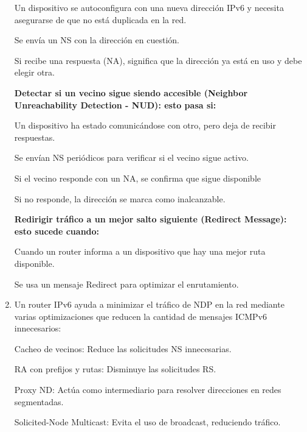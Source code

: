\documentclass[12pt]{article}
\begin{document}
\begin{enumerate}
 	\hspace{2cm}Un dispositivo se autoconfigura con una nueva dirección IPv6 y necesita asegurarse de que no está duplicada en la red.
 	
 	\hspace{2cm}Se envía un NS con la dirección en cuestión.
 	
 	\hspace{2cm}Si recibe una respuesta (NA), significa que la dirección ya está en uso y debe elegir otra.
 	
 	\textbf{Detectar si un vecino sigue siendo accesible (Neighbor Unreachability Detection - NUD): esto pasa si:}
 	
 	\hspace{2cm}Un dispositivo ha estado comunicándose con otro, pero deja de recibir respuestas.
 	
 	\hspace{2cm}Se envían NS periódicos para verificar si el vecino sigue activo.
 	
 	\hspace{2cm}Si el vecino responde con un NA, se confirma que sigue disponible
 	
 	\hspace{2cm}Si no responde, la dirección se marca como inalcanzable.
 	
 	\textbf{Redirigir tráfico a un mejor salto siguiente (Redirect Message): esto sucede cuando:}
 	
 	\hspace{2cm}Cuando un router informa a un dispositivo que hay una mejor ruta disponible.
 	
 	\hspace{2cm}Se usa un mensaje Redirect para optimizar el enrutamiento.
 	
 	\item Un router IPv6 ayuda a minimizar el tráfico de NDP en la red mediante varias optimizaciones que reducen la cantidad de mensajes ICMPv6 innecesarios:
 	
 	\hspace{2cm}Cacheo de vecinos: Reduce las solicitudes NS innecesarias.
 	
 	\hspace{2cm}RA con prefijos y rutas: Disminuye las solicitudes RS.
 	
 	\hspace{2cm}Proxy ND: Actúa como intermediario para resolver direcciones en redes segmentadas.
 	
 	\hspace{2cm}Solicited-Node Multicast: Evita el uso de broadcast, reduciendo tráfico.
 	

\end{enumerate}
\end{document}
